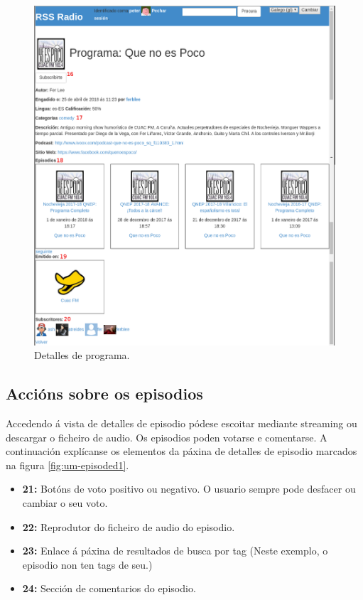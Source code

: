 \begin{figure}[h]
	\centering
	\includegraphics[scale=0.45,keepaspectratio=true]{./images/usermanual/um-programd1.png}
	\caption{Detalles de programa.}
	\label{fig:um-programd1}
\end{figure}

\subsection{Accións sobre os episodios}

Accedendo á vista de detalles de episodio pódese escoitar mediante streaming ou descargar o ficheiro de audio. Os episodios poden votarse e comentarse.  A continuación explícanse os elementos da páxina de detalles de episodio marcados na figura \ref{fig:um-episoded1}.

\begin{itemize}
	\item \textbf{21:} Botóns de voto positivo ou negativo. O usuario sempre pode desfacer ou cambiar o seu voto.
	\item \textbf{22:} Reprodutor do ficheiro de audio do episodio.
	\item \textbf{23:} Enlace á páxina de resultados de busca por tag (Neste exemplo, o episodio non ten tags de seu.)
	\item \textbf{24:} Sección de comentarios do episodio.
\end{itemize}


